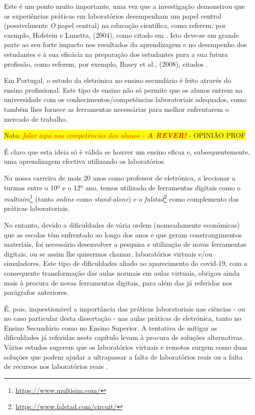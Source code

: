 Este é um ponto muito importante, uma vez que a investigação demonstrou que as experiências práticas em laboratórios desempenham um papel central (possivelmente \textit{O} papel central) na educação científica, como referem, por exemplo, Hofstein e Lunetta, (2004), como citado em \cite{BRINSON2015218}. Isto deve-se em grande parte ao seu forte impacto nos resultados da aprendizagem e no desempenho dos estudantes e à sua eficácia na preparação dos estudantes para a sua futura profissão, como referem, por exemplo, Basey et al., (2008), citados \cite{BRINSON2015218}. 

Em Portugal, o estudo da eletrónica no ensino secundário é feito através do ensino profissional. Este tipo de ensino não só permite que os alunos entrem na universidade com os conhecimentos/competências laboratoriais adequados, como também lhes fornece as ferramentas necessárias para melhor enfrentarem o mercado de trabalho\cite{anqep}. 

\colorbox{yellow}{Nota: \textit{\textcolor{red}{falar aqui nas competências dos alunos - \textbf{ A REVER!}}} - OPINIÃO PROF}

É claro que esta ideia só é válida se houver um ensino eficaz e, subsequentemente, uma aprendizagem efectiva utilizando os laboratórios.

Na nossa carreira de mais 20 anos como professor de eletrónica, a leccionar a turmas entre o 10º e o 12º ano, temos utilizado de ferramentas digitais como o \textit{multisim}\footnote{\url{https://www.multisim.com/}} (tanto \textit{online} como \textit{stand-alone}) e o \textit{falstad}\footnote{\url{https://www.falstad.com/circuit/}} como complemento das práticas laboratoriais. 

No entanto, devido a dificuldades de vária ordem (nomeadamente económicas) que as escolas têm enfrentado ao longo dos anos e que geram constrangimentos materiais, foi necessário desenvolver a pesquisa e utilização de novas ferramentas digitais, ou se assim lhe quisermos chamar, laboratórios virtuais e/ou simuladores.  
Este tipo de dificuldades aliado ao aparecimento do \acrshort{covid-19}, com a consequente transformação das aulas normais em aulas virtuais, obrigou ainda mais à procura de novas ferramentas digitais, para além das já referidas nos parágrafos anteriores.

É, pois, inquestionável a importância das práticas laboratoriais nas ciências - ou no caso particular desta dissertação - nas aulas práticas de eletrónica, tanto no Ensino Secundário como no Ensino Superior. A tentativa de mitigar as dificuldades já referidas neste capítulo levam à procura de soluções alternativas. Vários estudos sugerem que os laboratórios virtuais e remotos surgem como duas soluções que podem ajudar a ultrapassar a falta de laboratórios reais ou a falta de recursos nos laboratórios reais \cite{ImpactRemoteLabTeachingPractices} \cite{developremotelabs} \cite{HERADIO20161} \cite{POTKONJAK2016309}.

